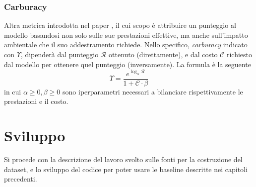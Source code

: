 \documentclass[12pt,a4paper,twoside,openright]{book}
\begin{document}
\subsection{Carburacy}
Altra metrica introdotta nel paper \cite{DBLP:conf/aaai/MoroRV23}, il cui scopo è attribuire un punteggio al modello basandosi non solo sulle sue prestazioni effettive, ma anche sull'impatto ambientale che il suo addestramento richiede. Nello specifico, \emph{carburacy} indicato con $\Upsilon$, dipenderà dal punteggio $\mathcal{R}$ ottenuto (direttamente), e dal costo $\mathcal{C}$ richiesto dal modello per ottenere quel punteggio (inversamente). La formula è la seguente
\begin{equation*}
    \Upsilon = \frac{e^{\log_\alpha \mathcal{R}}}{1 + \mathcal{C} \cdot \beta}
\end{equation*}
in cui $\alpha \geq 0, \beta \geq 0$ sono iperparametri necessari a bilanciare rispettivamente le prestazioni e il costo.


































\chapter{Sviluppo}
\label{cap:sviluppo}

Si procede con la descrizione del lavoro svolto sulle fonti per la costruzione del dataset, e lo sviluppo del codice per poter usare le baseline descritte nei capitoli precedenti. 
\end{document}
